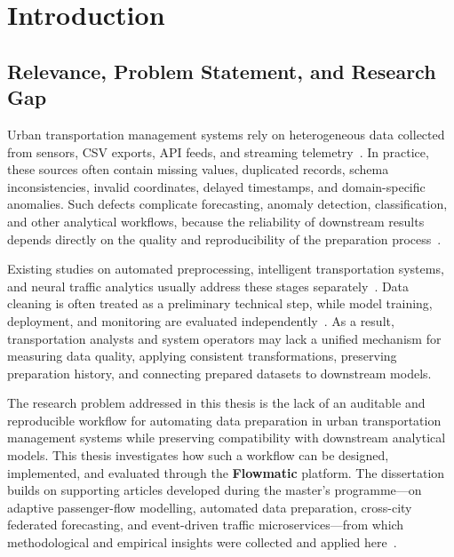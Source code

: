 %
%
\chapter{Introduction}
\label{chap:intro}
\setlength{\parskip}{1em}

\section{Relevance, Problem Statement, and Research Gap}

Urban transportation management systems rely on heterogeneous data collected from sensors, CSV exports, API feeds, and streaming telemetry~\cite{wang1996beyond,pipino2002data,zanella2014iot}. In practice, these sources often contain missing values, duplicated records, schema inconsistencies, invalid coordinates, delayed timestamps, and domain-specific anomalies. Such defects complicate forecasting, anomaly detection, classification, and other analytical workflows, because the reliability of downstream results depends directly on the quality and reproducibility of the preparation process~\cite{sculley2015hidden}.

Existing studies on automated preprocessing, intelligent transportation systems, and neural traffic analytics usually address these stages separately~\cite{liu2022automated,feurer2019auto,feurer2015autosklearn,its_bigdata2018,nie2023patchtst,yu2018stgcn,zeng2023transformers}. Data cleaning is often treated as a preliminary technical step, while model training, deployment, and monitoring are evaluated independently~\cite{zaharia2018accelerating,kreutzberger2022mlops}. As a result, transportation analysts and system operators may lack a unified mechanism for measuring data quality, applying consistent transformations, preserving preparation history, and connecting prepared datasets to downstream models.

The research problem addressed in this thesis is the lack of an auditable and reproducible workflow for automating data preparation in urban transportation management systems while preserving compatibility with downstream analytical models. This thesis investigates how such a workflow can be designed, implemented, and evaluated through the \textbf{Flowmatic} platform. The dissertation builds on supporting articles developed during the master's programme---on adaptive passenger-flow modelling, automated data preparation, cross-city federated forecasting, and event-driven traffic microservices---from which methodological and empirical insights were collected and applied here~\cite{bakytuly2024hybrid,yedilkhan2025flowmatic,bakytuly2025adaptive,bakytuly2026microservices,sakhipov2026xfedformer}.

